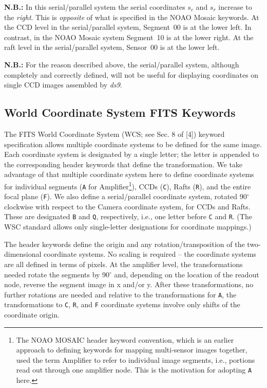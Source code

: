 \documentclass{article}[12pt]
\begin{document}
{{\bf N.B.:} In this serial/parallel system the serial coordinates $s_c$ and $s_r$ increase to the {\it right}.  This is {\it opposite} of what is specified in the NOAO Mosaic keywords.  At the CCD level in the serial/parallel system, Segment~00 is at the lower left.  In contrast, in the NOAO Mosaic system Segment~10 is at the lower right.  At the raft level in the serial/parallel system, Sensor~00 is at the lower left.

{\bf N.B.:} For the reason described above, the serial/parallel system, although completely and correctly defined, will not be useful for displaying coordinates on single CCD images assembled by {\it ds9}.

\subsection{World Coordinate System FITS Keywords}
The FITS World Coordinate System (WCS; see Sec. 8 of [4]) keyword specification allows multiple coordinate systems to be defined for the same image.  Each coordinate system is designated by a single letter; the letter is appended to the corresponding header keywords that define the transformation.  We take advantage of that multiple coordinate system here to define coordinate systems for individual segments ({\tt A} for Amplifier\footnote{The NOAO MOSAIC header keyword convention, which is an earlier approach to defining keywords for mapping multi-sensor images together, used the term Amplifier to refer to individual image segments, i.e., portions read out through one amplifier node.  This is the motivation for adopting {\tt A} here.}), CCDs ({\tt C}), Rafts ({\tt R}), and the entire focal plane ({\tt F}). We also define a serial/parallel coordinate system, rotated 90$^\circ$ clockwise with respect to the Camera coordinate system, for CCDs and Rafts.  These are designated {\tt B} and {\tt Q}, respectively, i.e., one letter before {\tt C} and {\tt R}.  (The WSC standard allows only single-letter designations for coordinate mappings.)

The header keywords define the origin and any rotation/transposition of the two-dimensional coordinate systems.   No scaling is required -- the coordinate systems are all defined in terms of pixels.  At the amplifier level, the transformations needed rotate the segments by 90$^\circ$ and, depending on the location of the readout node, reverse the segment image in x and/or y.  After these transformations, no further rotations are needed and relative to the transformations for {\tt A}, the transformations to {\tt C}, {\tt R}, and {\tt F} coordinate systems involve only shifts of the coordinate origin.

}
\end{document}
